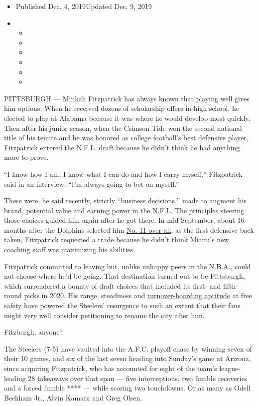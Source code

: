 \begin{itemize}
\item
  Published Dec. 4, 2019Updated Dec. 9, 2019
\item
  \begin{itemize}
  \item
  \item
  \item
  \item
  \item
  \item
  \end{itemize}
\end{itemize}

PITTSBURGH --- Minkah Fitzpatrick has always known that playing well
gives him options. When he received dozens of scholarship offers in high
school, he elected to play at Alabama because it was where he would
develop most quickly. Then after his junior season, when the Crimson
Tide won the second national title of his tenure and he was honored as
college football's best defensive player, Fitzpatrick entered the N.F.L.
draft because he didn't think he had anything more to prove.

``I know how I am, I know what I can do and how I carry myself,''
Fitzpatrick said in an interview. ``I'm always going to bet on myself.''

These were, he said recently, strictly ``business decisions,'' made to
augment his brand, potential value and earning power in the N.F.L. The
principles steering those choices guided him again after he got there.
In mid-September, about 16 months after the Dolphins selected him
\href{https://www.pro-football-reference.com/players/F/FitzMi00.htm}{No.
11 over all}, as the first defensive back taken, Fitzpatrick requested a
trade because he didn't think Miami's new coaching staff was maximizing
his abilities.

Fitzpatrick committed to leaving but, unlike unhappy peers in the
N.B.A., could not choose where he'd be going. That destination turned
out to be Pittsburgh, which surrendered a bounty of draft choices that
included its first- and fifth-round picks in 2020. His range, steadiness
and
\href{https://www.pro-football-reference.com/players/F/FitzMi00/gamelog/2019/}{turnover-hoarding
aptitude} at free safety have powered the Steelers' resurgence to such
an extent that their fans might very well consider petitioning to rename
the city after him.

Fitzburgh, anyone?

The Steelers (7-5) have vaulted into the A.F.C. playoff chase by winning
seven of their 10 games, and six of the last seven heading into Sunday's
game at Arizona, since acquiring Fitzpatrick, who has accounted for
eight of the team's league-leading 28 takeaways over that span --- five
interceptions, two fumble recoveries and a forced fumble **** --- while
scoring two touchdowns. Or as many as Odell Beckham Jr., Alvin Kamara
and Greg Olsen.

